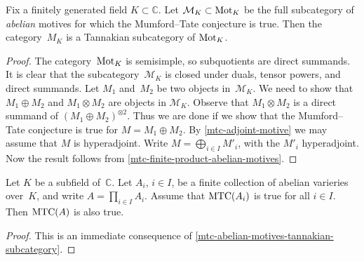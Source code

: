 \documentclass[10pt,twoside,leqno]{article}
\numberwithin{equation}{subsection}
\newcommand{\CC}{\mathbb{C}}
\newcommand{\Mot}{\textnormal{Mot}}
\newcommand{\MTC}{\textnormal{MTC}}
\begin{document}
\begin{theorem} %
	\label{mtc-abelian-motives-tannakian-subcategory}
	Fix a finitely generated field $K \subset \CC$.
	Let $\mathcal{M}_{K} \subset \Mot_{K}$ be the full subcategory
	of \emph{abelian} motives for which the Mumford--Tate conjecture is true.
	Then the category~$M_{K}$ is a Tannakian subcategory of $\Mot_{K}$.
	\begin{proof}
		The category~$\Mot_{K}$ is semisimple,
		so subquotients are direct summands.
		It is clear that the subcategory~$\mathcal{M}_{K}$
		is closed under duals, tensor powers, and direct summands.
		Let $M_{1}$ and~$M_{2}$ be two objects in~$\mathcal{M}_{K}$.
		We need to show that $M_{1} \oplus M_{2}$
		and $M_{1} \otimes M_{2}$ are objects in $\mathcal{M}_{K}$.
		Observe that $M_{1} \otimes M_{2}$ is a direct summand of
		$(M_{1} \oplus M_{2})^{\otimes 2}$.
		Thus we are done if we show that the Mumford--Tate conjecture is true for
		$M = M_{1} \oplus M_{2}$.
		By \cref{mtc-adjoint-motive} we may assume that $M$ is hyperadjoint.
		Write $M = \bigoplus_{i \in I} M'_{i}$,
		with the $M'_{i}$ hyperadjoint.
		Now the result follows from \cref{mtc-finite-product-abelian-motives}.
	\end{proof}
\end{theorem}

\begin{theorem} %
 \label{mtcaxa}
 Let $K$ be a subfield of~$\CC$.
 Let $A_i$, $i \in I$, be a finite collection of abelian varieries over~$K$,
	and write $A = \prod_{i \in I} A_i$.
 Assume that $\MTC(A_i)$ is true for all $i \in I$.
 Then $\MTC(A)$ is also true.
 \begin{proof}
  This is an immediate consequence of
  \cref{mtc-abelian-motives-tannakian-subcategory}.
 \end{proof}
\end{theorem}


\printbibliography
\end{document}
